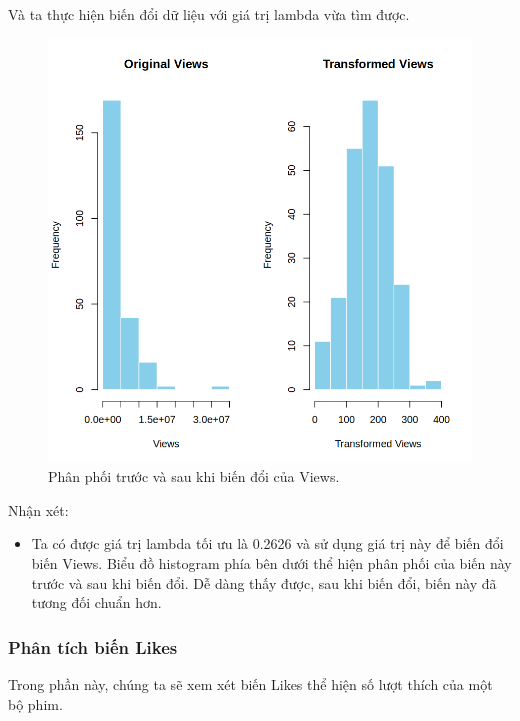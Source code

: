 Và ta thực hiện biến đổi dữ liệu với giá trị lambda vừa tìm được.
\begin{figure}[H]
    \centering
    \includegraphics[width=0.75\columnwidth]{csm_figures/views_transformed_distribution.png}
    \caption{Phân phối trước và sau khi biến đổi của Views.}
    \label{fig:views_transformed_distribution}
\end{figure}
Nhận xét:
\begin{itemize}
    \item Ta có được giá trị lambda tối ưu là 0.2626 và sử dụng giá trị này để biến đổi biến Views. Biểu đồ histogram phía bên dưới thể hiện phân phối của biến này trước và sau khi biến đổi. Dễ dàng thấy được, sau khi biến đổi, biến này đã tương đối chuẩn hơn.
\end{itemize}

\subsubsection{Phân tích biến Likes}

Trong phần này, chúng ta sẽ xem xét biến Likes thể hiện số lượt thích của một bộ phim.

